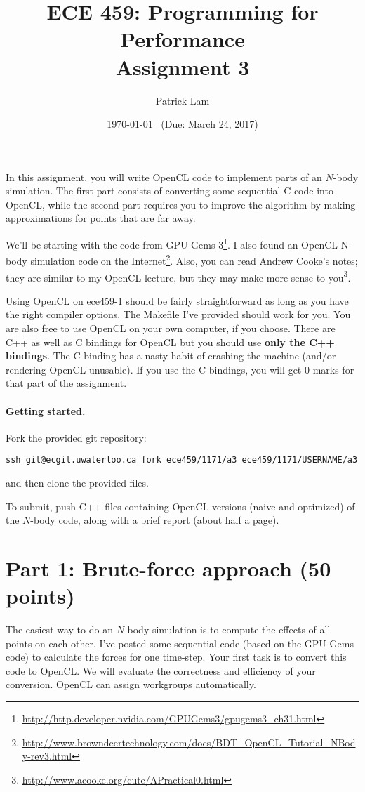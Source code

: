 \documentclass[letterpaper,10pt]{article}
\title{\bf ECE 459: Programming for Performance\\Assignment 3}
\author{Patrick Lam}
\date{\today ~ (Due: March 24, 2017)}
\begin{document}
\maketitle

In this assignment, you will write OpenCL code to implement parts of
an $N$-body simulation.  The first part consists of converting some
sequential C code into OpenCL, while the second part requires you to
improve the algorithm by making approximations for points that are far
away.

We'll be starting with the code from GPU Gems 3\footnote{\url{http://http.developer.nvidia.com/GPUGems3/gpugems3_ch31.html}}.
I also found an OpenCL N-body simulation code on the Internet\footnote{\url{http://www.browndeertechnology.com/docs/BDT_OpenCL_Tutorial_NBody-rev3.html}}. Also, you can read Andrew Cooke's notes; they are similar to my OpenCL lecture, but they may make more sense to you\footnote{\url{http://www.acooke.org/cute/APractical0.html}}.

Using OpenCL on ece459-1 should be fairly straightforward as long as
you have the right compiler options. The Makefile I've provided
should work for you. You are also free to use OpenCL on your own
computer, if you choose. There are C++ as well as C bindings for OpenCL but you should use \textbf{only the C++ bindings}. The C binding has a nasty habit of crashing the machine (and/or rendering OpenCL unusable). If you use the C bindings, you will get 0 marks for that part of the assignment.

\paragraph{Getting started.} Fork the provided git repository:
\begin{center}
{\tt ssh git@ecgit.uwaterloo.ca fork ece459/1171/a3 ece459/1171/USERNAME/a3}
\end{center}
\noindent and then clone the provided files.

To submit, push C++ files containing OpenCL versions (naive and optimized) of
the $N$-body code, along with a brief report (about half a page).

\section*{Part 1: Brute-force approach (50 points)}
The easiest way to do an $N$-body simulation is to compute the effects
of all points on each other. I've posted some sequential code (based
on the GPU Gems code) to calculate the forces for one time-step. Your
first task is to convert this code to OpenCL. We will evaluate the
correctness and efficiency of your conversion. OpenCL can assign
workgroups automatically.
\end{document}
